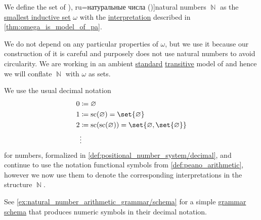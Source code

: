 \begin{definition}\label{def:natural_numbers}
  We define the set of \term[bg=естествени числа (\cite[371]{ГеновМиховскиМоллов1991Алгебра}), ru=натуральные числа (\cite[def. 11.1]{АлександровМаркушевичХинчинИПр1951ЭнциклопедияТом1})]{natural numbers} \( \BbbN \) as the \hyperref[thm:smallest_inductive_set_existence]{smallest inductive set} \( \omega \) with the \hyperref[def:first_order_structure/interpretation]{interpretation} described in \cref{thm:omega_is_model_of_pa}.

  We do not depend on any particular properties of \( \omega \), but we use it because our construction of it is careful and purposely does not use natural numbers to avoid circularity. We are working in an ambient \hyperref[rem:standard_model_of_set_theory]{standard} \hyperref[rem:transitive_model_of_set_theory]{transitive} model of \hyperref[def:axiom_of_universes]{} and hence we will conflate \( \BbbN \) with \( \omega \) as sets.

  We use the usual decimal notation
  \begin{align*}
    0 &\coloneqq \varnothing \\
    1 &\coloneqq \op{sc}(\varnothing) = \set{ \varnothing } \\
    2 &\coloneqq \op{sc}(\op{sc}(\varnothing)) = \set{ \varnothing, \set{ \varnothing } } \\
      &\vdots
  \end{align*}
  for numbers, formalized in \cref{def:positional_number_system/decimal}, and continue to use the notation functional symbols from \cref{def:peano_arithmetic}, however we now use them to denote the corresponding interpretations in the structure \( \BbbN \).
\end{definition}
\begin{comments}
  \item See \cref{ex:natural_number_arithmetic_grammar/schema} for a simple \hyperref[def:formal_grammar/schema]{grammar schema} that produces numeric symbols in their decimal notation.
\end{comments}

